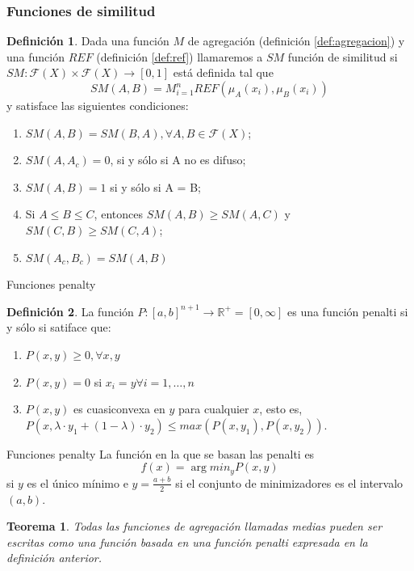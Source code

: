 \documentclass{beamer}
\theoremstyle{plain} %
\newtheorem{thm}{Teorema}
\theoremstyle{definition}
\newtheorem{defn}{Definición}
\def\RR{\mathbb{R}}
\def\FF{\mathcal{F}}
\begin{document}
\begin{frame}[squeeze]
  \frametitle{Funciones de similitud}
  \begin{defn}\label{def:similitud}
  Dada una función $M$ de agregación (definición \ref{def:agregacion}) y una función $REF$ (definición \ref{def:ref}) llamaremos a $SM$ función de similitud si $SM : \FF(X) \times \FF(X) \rightarrow [0,1]$ está definida tal que 
  $$SM(A,B)=M^n_{i=1}REF(\mu_A(x_i), \mu_B(x_i))$$
  y satisface las siguientes condiciones:
    \begin{enumerate}
    \item $SM(A, B) = SM(B, A), \forall A, B \in \FF(X)$;
    \item $SM(A, A_c) = 0$, si y sólo si A no es difuso;
    \item $SM(A, B) = 1$ si y sólo si A = B;
    \item Si $A\leq B\leq C$, entonces $SM(A, B)\geq SM(A,C)$ y $SM(C, B)\geq SM(C,A)$;
    \item $SM(A_c, B_c) = SM(A,B)$
    \end{enumerate} 
  \end{defn}
\end{frame}

\begin{frame}{Funciones penalty}
  \begin{defn}\label{def:penalti}
  La función $P:[a,b]^{n+1}\rightarrow \RR^{+} = [0, \infty]$ es una función penalti si y sólo si satiface que:
  \begin{enumerate}
    \item $P(x, y) \geq 0, \forall x, y$
    \item $P(x, y) = 0$ si $x_{i}=y \forall i=1,\dots ,n$
    \item $P(x,y)$ es cuasiconvexa en $y$ para cualquier $x$, esto es, $P(x, \lambda\cdot y_{1} +(1-\lambda)\cdot y_{2})\leq max(P(x, y_{1}), P(x, y_{2}))$.
  \end{enumerate}
  \end{defn}
\end{frame}

\begin{frame}{Funciones penalty}
  La función en la que se basan las penalti es $$f(x)=\arg min_{y} P(x,y)$$ si $y$ es el único mínimo e $y=\frac{a+b}{2}$ si el conjunto de minimizadores es el intervalo $(a, b)$.

  \begin{thm}
  Todas las funciones de agregación llamadas medias pueden ser escritas como una función basada en una función penalti expresada en la definición anterior.
  \end{thm}
\end{frame}
\end{document}
